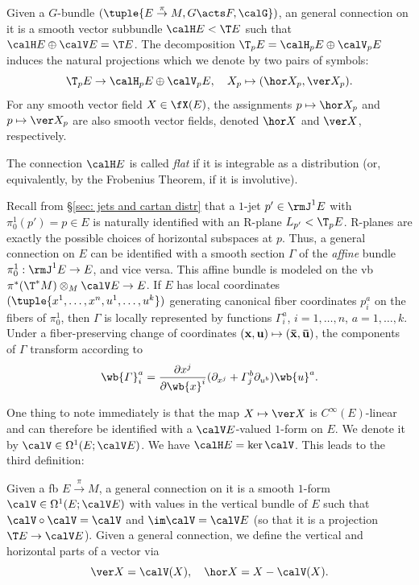 \begin{defn}
    Given a $G$-bundle $(\tuple{E\overset{\pi}{\to}M,G\acts F,\calG})$, an general connection on it is a smooth vector subbundle $\calH E<\T E$ such that $\calH E\oplus \calV E=\T E$. The decomposition $\T_pE=\calH_pE\oplus \calV_pE$ induces the natural projections which we denote by two pairs of symbols:
    \[\T_pE\to \calH_pE\oplus \calV_pE,\quad X_p\mapsto (\hor X_p,\ver X_p).\]
    For any smooth vector field $X\in\fX(E)$, the assignments $p\mapsto \hor X_p$ and $p\mapsto \ver X_p$ are also smooth vector fields, denoted $\hor X$ and $\ver X$, respectively.

    The connection $\calH E$ is called \emph{flat} if it is integrable as a distribution (or, equivalently, by the Frobenius Theorem, if it is involutive).
\end{defn}


\begin{rem}\label{rem connections via jets}
    Recall from \S\ref{sec: jets and cartan distr} that a $1$-jet $p'\in \rmJ^1 E$ with $\pi^1_0(p')=p\in E$ is naturally identified with an R-plane $L_{p'}<\T_p E$. R-planes are exactly the possible choices of horizontal subspaces at $p$. Thus, a general connection on $E$ can be identified with a smooth section $\varGamma$ of the \emph{affine} bundle $\pi^1_0:\rmJ^1 E\to E$, and vice versa. This affine bundle is modeled on the \gls{vb} $\pi^\ast(\T^\ast M)\otimes_M \calV E\to E$. If $E$ has local coordinates $(\tuple{x^1,\ldots,x^n,u^1,\ldots,u^k})$ generating canonical fiber coordinates $p^a_i$ on the fibers of $\pi^1_0$, then $\varGamma$ is locally represented by functions $\varGamma^a_i$, $i=1,\ldots,n$, $a=1,\ldots,k$. Under a fiber-preserving change of coordinates $(\bf{x},\bf{u})\mapsto (\bar{\bf{x}},\bar{\bf{u}})$, the components of $\varGamma$ transform according to 
    \[\wb{\varGamma}^a_i=\frac{\partial x^j}{\partial \wb{x}^i}(\partial_{x^j}+\varGamma^b_j\partial_{u^b})\wb{u}^a.\]
\end{rem}

One thing to note immediately is that the map $X\mapsto \ver X$ is  $C^\infty(E)$-linear and can therefore be identified with a $\calV E$-valued $1$-form on $E$. We denote it by $\calV\in\Omega^1(E;\calV E)$. We have $\calH E=\ker \calV$. This leads to the third definition:

\begin{defn}
    Given a \gls{fb} $E\overset{\pi}{\to}M$, a general connection on it is a smooth $1$-form $\calV\in\Omega^1(E;\calV E)$ with values in the vertical bundle of $E$ such that $\calV\circ\calV=\calV$ and $\im\calV=\calV E$ (so that it is a projection $\T E\to \calV E$). Given a general connection, we define the vertical and horizontal parts of a vector via
    \[\ver X=\calV(X),\quad \hor X=X-\calV(X).\]
\end{defn}

